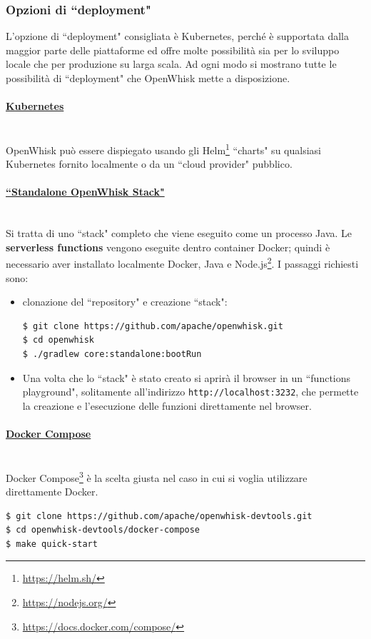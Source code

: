 \documentclass[12pt,a4paper,openany,twoside]{book}
\begin{document}
\subsubsection{Opzioni di ``deployment"}

L'opzione di ``deployment" consigliata è Kubernetes, perché è supportata dalla maggior parte delle piattaforme ed offre molte possibilità sia per lo sviluppo locale che per produzione su larga scala. Ad ogni modo si mostrano tutte le possibilità di ``deployment" che OpenWhisk mette a disposizione.

\paragraph{\underline{Kubernetes}} ~\\
OpenWhisk può essere dispiegato usando gli Helm\footnote{\url{https://helm.sh/}} ``charts" su qualsiasi Kubernetes fornito localmente o da un ``cloud provider" pubblico.

\paragraph{\underline{``Standalone OpenWhisk Stack"}} ~\\
Si tratta di uno ``stack" completo che viene eseguito come un processo Java. Le \textbf{serverless functions} vengono eseguite dentro container Docker; quindi è necessario aver installato localmente Docker, Java e Node.js\footnote{\url{https://nodejs.org/}}.
I passaggi richiesti sono:
\begin{itemize}
    \item clonazione del ``repository" e creazione ``stack":
    \begin{lstlisting}
$ git clone https://github.com/apache/openwhisk.git
$ cd openwhisk
$ ./gradlew core:standalone:bootRun\end{lstlisting}

    \item Una volta che lo ``stack" è stato creato si aprirà il browser in un ``functions playground", solitamente all'indirizzo \texttt{http://localhost:3232}, che permette la creazione e l'esecuzione delle funzioni direttamente nel browser.
\end{itemize}

\paragraph{\underline{Docker Compose}} ~\\
Docker Compose\footnote{\url{https://docs.docker.com/compose/}} è la scelta giusta nel caso in cui si voglia utilizzare direttamente Docker. 
\begin{lstlisting}
$ git clone https://github.com/apache/openwhisk-devtools.git
$ cd openwhisk-devtools/docker-compose
$ make quick-start\end{lstlisting}
\end{document}
